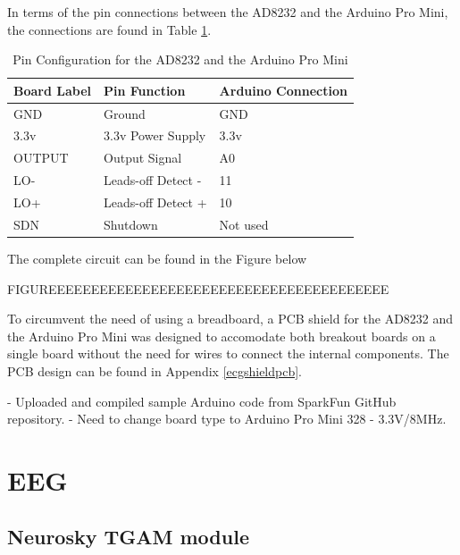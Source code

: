 In terms of the pin connections between the AD8232 and the Arduino Pro Mini, the connections are found in Table \ref{ad8232pinconfigurationtable}.

\begin{table}[H]
	\centering
	\caption{Pin Configuration for the AD8232 and the Arduino Pro Mini \cite{ad8232}}
	\label{ad8232pinconfigurationtable}
	\begin{tabular}{|l|l|l|}
		\hline
		\textbf{Board Label} & \textbf{Pin Function} & \textbf{Arduino Connection} \\ \hline
		GND                  & Ground                & GND                         \\ \hline
		3.3v                 & 3.3v Power Supply     & 3.3v                        \\ \hline
		OUTPUT               & Output Signal         & A0                          \\ \hline
		LO-                  & Leads-off Detect -    & 11                          \\ \hline
		LO+                  & Leads-off Detect +    & 10                          \\ \hline
		SDN                  & Shutdown              & Not used                    \\ \hline
	\end{tabular}
\end{table}


The complete circuit can be found in the Figure below 

FIGUREEEEEEEEEEEEEEEEEEEEEEEEEEEEEEEEEEEEEEEE

To circumvent the need of using a breadboard, a PCB shield for the AD8232 and the Arduino Pro Mini was designed to accomodate both breakout boards on a single board without the need for wires to connect the internal components. The PCB design can be found in Appendix \ref{ecgshieldpcb}. 

- Uploaded and compiled sample Arduino code from SparkFun GitHub repository. 
- Need to change board type to Arduino Pro Mini 328 - 3.3V/8MHz. 

\section{EEG}

\subsection{Neurosky TGAM module}

